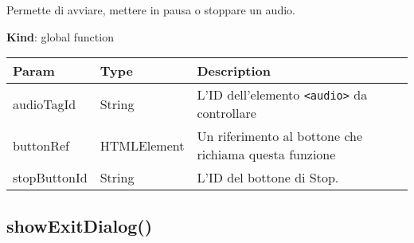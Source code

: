 Permette di avviare, mettere in pausa o stoppare un audio.

\textbf{Kind}: global function

\begin{longtable}[]{@{}lll@{}}
\toprule
\begin{minipage}[b]{0.30\columnwidth}\raggedright
Param\strut
\end{minipage} & \begin{minipage}[b]{0.30\columnwidth}\raggedright
Type\strut
\end{minipage} & \begin{minipage}[b]{0.30\columnwidth}\raggedright
Description\strut
\end{minipage}\tabularnewline
\midrule
\endhead
\begin{minipage}[t]{0.30\columnwidth}\raggedright
audioTagId\strut
\end{minipage} & \begin{minipage}[t]{0.30\columnwidth}\raggedright
String\strut
\end{minipage} & \begin{minipage}[t]{0.30\columnwidth}\raggedright
L'ID dell'elemento \texttt{\textless{}audio\textgreater{}} da
controllare\strut
\end{minipage}\tabularnewline
\begin{minipage}[t]{0.30\columnwidth}\raggedright
buttonRef\strut
\end{minipage} & \begin{minipage}[t]{0.30\columnwidth}\raggedright
HTMLElement\strut
\end{minipage} & \begin{minipage}[t]{0.30\columnwidth}\raggedright
Un riferimento al bottone che richiama questa funzione\strut
\end{minipage}\tabularnewline
\begin{minipage}[t]{0.30\columnwidth}\raggedright
stopButtonId\strut
\end{minipage} & \begin{minipage}[t]{0.30\columnwidth}\raggedright
String\strut
\end{minipage} & \begin{minipage}[t]{0.30\columnwidth}\raggedright
L'ID del bottone di Stop.\strut
\end{minipage}\tabularnewline
\bottomrule
\end{longtable}

\hypertarget{showexitdialog}{%
\subsection{showExitDialog()}\label{showexitdialog}}

